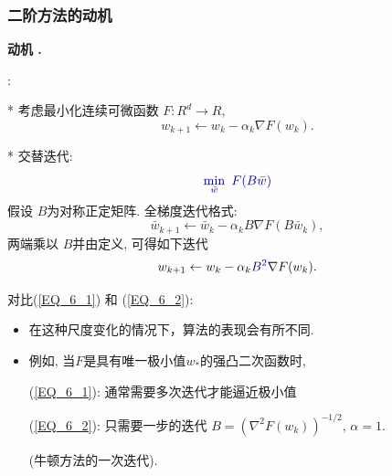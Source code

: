 \documentclass[handout]{beamer}
\begin{document}
\begin{frame}[allowframebreaks]%
\frametitle{二阶方法的动机}

{\normalsize\textbf{动机 .}}

 :

 * 考虑最小化连续可微函数  $F: R^d \rightarrow
R$,
\begin{equation}\label{EQ_6_1}
    w_{k+1} \leftarrow w_k - \alpha_k \nabla F(w_k).
\end{equation}

* 交替迭代:
$$
\dblue{
    \min_{\bar{w}}\ F(B\bar{w})
}
$$
假设 $B$为对称正定矩阵.
全梯度迭代格式:
$$
    \bar{w}_{k+1} \leftarrow \bar{w}_k - \alpha_k B \nabla F(B\bar{w}_k),
$$
两端乘以 $B$并由定义, 可得如下迭代
\begin{equation}\label{EQ_6_2}
    w_{k+1} \leftarrow w_k - \alpha_k \dblue{B^2} \nabla F(w_k).
\end{equation}

对比(\ref{EQ_6_1}) 和 (\ref{EQ_6_2}):
\begin{itemize}
    \item 在这种尺度变化的情况下，算法的表现会有所不同.

     \item  例如, 当$F$是具有唯一极小值$w_*$的强凸二次函数时,

       (\ref{EQ_6_1}): 通常需要多次迭代才能逼近极小值

       (\ref{EQ_6_2}): 只需要一步的迭代 $B = (\nabla^2F(w_k))_{}^{-1/2}$, $\alpha = 1$.

         (牛顿方法的一次迭代).

\end{itemize}
\end{frame}
\end{document}
